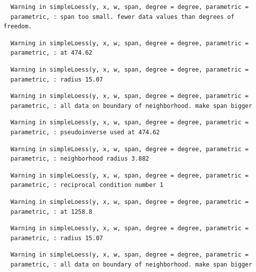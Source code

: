 \documentclass[12pt,twoside]{reedthesis}
\begin{document}
  \begin{verbatim}
  Warning in simpleLoess(y, x, w, span, degree = degree, parametric =
  parametric, : span too small. fewer data values than degrees of freedom.
  \end{verbatim}
  
  \begin{verbatim}
  Warning in simpleLoess(y, x, w, span, degree = degree, parametric =
  parametric, : at 474.62
  \end{verbatim}
  
  \begin{verbatim}
  Warning in simpleLoess(y, x, w, span, degree = degree, parametric =
  parametric, : radius 15.07
  \end{verbatim}
  
  \begin{verbatim}
  Warning in simpleLoess(y, x, w, span, degree = degree, parametric =
  parametric, : all data on boundary of neighborhood. make span bigger
  \end{verbatim}
  
  \begin{verbatim}
  Warning in simpleLoess(y, x, w, span, degree = degree, parametric =
  parametric, : pseudoinverse used at 474.62
  \end{verbatim}
  
  \begin{verbatim}
  Warning in simpleLoess(y, x, w, span, degree = degree, parametric =
  parametric, : neighborhood radius 3.882
  \end{verbatim}
  
  \begin{verbatim}
  Warning in simpleLoess(y, x, w, span, degree = degree, parametric =
  parametric, : reciprocal condition number 1
  \end{verbatim}
  
  \begin{verbatim}
  Warning in simpleLoess(y, x, w, span, degree = degree, parametric =
  parametric, : at 1258.8
  \end{verbatim}
  
  \begin{verbatim}
  Warning in simpleLoess(y, x, w, span, degree = degree, parametric =
  parametric, : radius 15.07
  \end{verbatim}
  
  \begin{verbatim}
  Warning in simpleLoess(y, x, w, span, degree = degree, parametric =
  parametric, : all data on boundary of neighborhood. make span bigger
  \end{verbatim}
  
\end{document}
